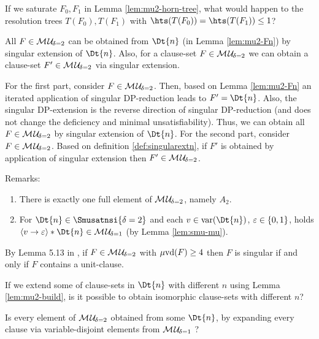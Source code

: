 \documentclass{report}
\begin{document}
\begin{quest}\label{que:mu-2-horn}
If we saturate $F_0, F_1$ in Lemma \ref{lem:mu2-horn-tree}, what would happen to the resolution trees $T(F_0), T(F_1)$ with $\hts(T(F_0))= \hts(T(F_1)) \le 1$?
\end{quest}

\begin{lem}\label{lem:mu2-build}
All $F \in \mathcal{M\hspace{0.8pt}U}_{\!\delta=2}$ can be obtained from $\Dt{n}$ (in Lemma \ref{lem:mu2-Fn}) by singular extension of  $\Dt{n}$. Also, for a clause-set $F \in \mathcal{M\hspace{0.8pt}U}_{\!\delta=2}$ we can obtain a clause-set $F' \in \mathcal{M\hspace{0.8pt}U}_{\!\delta=2}$ via singular extension.
\end{lem}
\begin{prf}
For the first part, consider $F \in \mathcal{M\hspace{0.8pt}U}_{\!\delta=2}$. Then, based on Lemma \ref{lem:mu2-Fn} an iterated application of singular DP-reduction leads to $F'=\Dt{n}$. Also, the singular DP-extension is the reverse direction of singular DP-reduction (and does not change the deficiency and minimal unsatisfiability). Thus, we can obtain all $F \in \mathcal{M\hspace{0.8pt}U}_{\!\delta=2}$ by singular extension of $\Dt{n}$. For the second part, consider $F \in \mathcal{M\hspace{0.8pt}U}_{\!\delta=2}$. Based on definition \ref{def:singularextn}, if $F'$ is obtained by application of singular extension then $F' \in \mathcal{M\hspace{0.8pt}U}_{\!\delta=2}$.
\end{prf}
Remarks:
  \begin{enumerate}
  \item There is exactly one full element of $\mathcal{M\hspace{0.8pt}U}_{\!\delta=2}$, namely $A_2$.
  \item For $\Dt{n} \in \Smusatnsi{\delta=2}$ and each $v \in \var(\Dt{n})$, $\varepsilon \in \{ 0,1 \}$, holds $\pao v{\ve} * \Dt{n} \in \Musati{\delta=1}$ (by Lemma \ref{lem:smu-mu}).
  \end{enumerate}
  
\begin{lem}\label{lem:mu2-sing}
 By Lemma 5.13 in \cite{KullmannZhao2010Extremal}, if $F \in \mathcal{M\hspace{0.8pt}U}_{\!\delta=2}$ with $\operatorname{\mu\!\operatorname{vd}}(F) \ge 4$ then $F$ is singular if and only if $F$ contains a unit-clause.
\end{lem}  

\begin{quest}\label{que:mu-2-ism}
If we extend some of clause-sets in $\Dt{n}$ with different $n$ using Lemma \ref{lem:mu2-build}, is it possible to obtain isomorphic clause-sets with different $n$?
\end{quest}

\begin{quest}\label{que:mu2-from-mu1}
Is every element of $\mathcal{M\hspace{0.8pt}U}_{\!\delta=2}$ obtained from some $\Dt{n}$, by expanding every clause via variable-disjoint elements from $\mathcal{M\hspace{0.8pt}U}_{\!\delta=1}$ ?
\end{quest}
\end{document}
